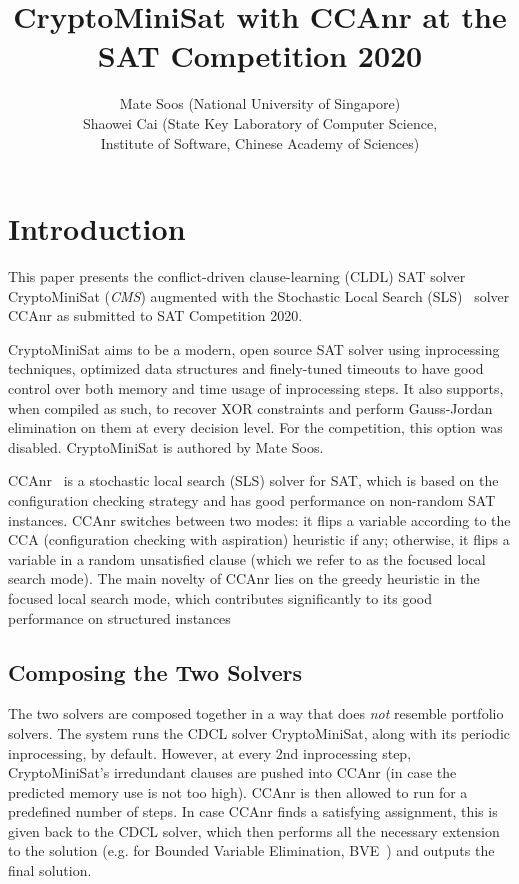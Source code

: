 \documentclass[final]{ieee}
\begin{document}
\title{CryptoMiniSat with CCAnr at the SAT Competition 2020}
\author{Mate Soos (National University of Singapore)\\
Shaowei Cai (State Key Laboratory of Computer Science,\\Institute of Software, Chinese Academy of Sciences)}

\maketitle
\thispagestyle{empty}
\pagestyle{empty}

\section{Introduction}
This paper presents the conflict-driven clause-learning (CLDL) SAT solver CryptoMiniSat (\emph{CMS}) augmented with the Stochastic Local Search (SLS)~\cite{DBLP:conf/sat/CaiLS15} solver CCAnr as submitted to SAT Competition 2020.

CryptoMiniSat aims to be a modern, open source SAT solver using inprocessing techniques, optimized data structures and finely-tuned timeouts to have good control over both memory and time usage of inprocessing steps. It also supports, when compiled as such, to recover XOR constraints and perform Gauss-Jordan elimination on them at every decision level. For the competition, this option was disabled. CryptoMiniSat is authored by Mate Soos.

CCAnr~\cite{DBLP:conf/sat/CaiLS15} is a stochastic local search (SLS) solver for SAT, which is based on the configuration checking strategy and has good performance on non-random SAT instances. CCAnr switches between two modes: it flips a variable according to the CCA (configuration checking with aspiration) heuristic if any; otherwise, it flips a variable in a random unsatisfied clause (which we refer to as the focused local search mode). The main novelty of CCAnr lies on the greedy heuristic in the focused local search mode, which contributes significantly to its good performance on structured instances

\subsection{Composing the Two Solvers}
The two solvers are composed together in a way that does \emph{not} resemble portfolio solvers. The system runs the CDCL solver CryptoMiniSat, along with its periodic inprocessing, by default. However, at every 2nd inprocessing step, CryptoMiniSat's irredundant clauses are pushed into CCAnr (in case the predicted memory use is not too high). CCAnr is then allowed to run for a predefined number of steps. In case CCAnr finds a satisfying assignment, this is given back to the CDCL solver, which then performs all the necessary extension to the solution (e.g. for Bounded Variable Elimination, BVE~\cite{BVE}) and outputs the final solution.
\end{document}
